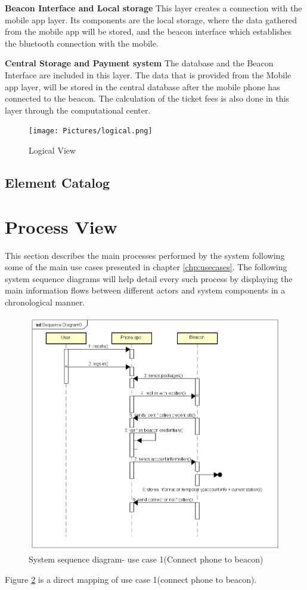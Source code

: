 \textbf{Beacon Interface and Local storage} This layer creates a connection with the mobile app layer. Its components are the local storage, where the data gathered from the mobile app will be stored, and the beacon interface which establishes the bluetooth connection with the mobile.

\textbf{Central Storage and Payment system} The database and the Beacon Interface are included in this layer. The data that is provided from the Mobile app layer, will be stored in the central database after the mobile phone has connected to the beacon. The calculation of the ticket fees is also done in this layer through the computational center.

\begin{figure}[H]
  \centering
  \texttt{[image: Pictures/logical.png]}
  \caption{Logical View}
  \label{fig:logical}
\end{figure}
\subsection{Element Catalog}

\section{Process View}
This section describes the main processes performed by the system following some of the main use cases presented in chapter \ref{chp:usecases}. The following system sequence diagrams will help detail every such process by displaying the main information flows between different actors and system components in a chronological manner.

\begin{figure}[H]
	\centering
	\includegraphics[width=\textwidth]{Pictures/seq_diagram_uc1.png}
	\caption{System sequence diagram- use case 1(Connect phone to beacon)}
	\label{fig:seqDiagram1}
\end{figure}
Figure \ref{fig:seqDiagram1} is a direct mapping of use case 1(connect phone to beacon).

